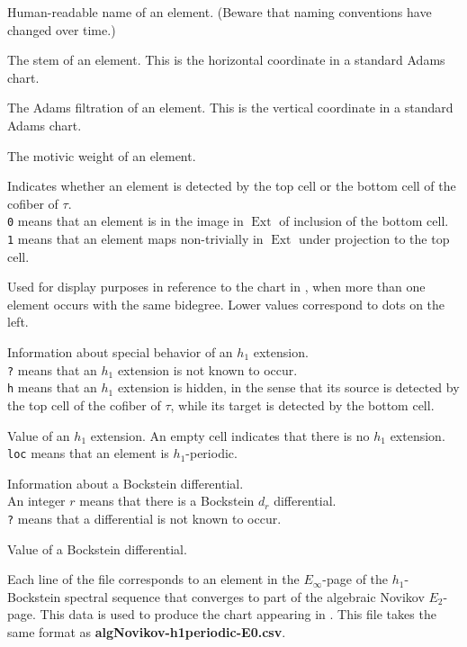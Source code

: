 \documentclass{amsart}
\DeclareMathOperator{\Ext}{Ext}
\begin{document}
  Human-readable name of an element.
(Beware that naming conventions have changed over time.)

 The stem of an element.  This is the
horizontal coordinate in a standard Adams chart.

 The Adams filtration of 
an element.  This is the vertical coordinate in a standard 
Adams chart.

 The motivic weight of an element.

 Indicates whether an element is detected by the top cell
or the bottom cell of the cofiber of $\tau$. \\
\texttt{0} means that an element is in the image in $\Ext$ 
of inclusion of the bottom cell.\\
\texttt{1} means that an element maps non-trivially in $\Ext$ 
under projection to the top cell.

 Used for display purposes
in reference to the chart in \cite{IWX19c},
when more than one element occurs with the same bidegree.
Lower values correspond to dots on the left.

Information about special behavior of an $h_1$ extension. \\
\texttt{?} means that an $h_1$ extension is not known to occur. \\
\texttt{h} means that an $h_1$ extension is hidden, in the sense
that its source is detected by the top cell of the cofiber of $\tau$,
while its target is detected by the bottom cell.

Value of an $h_1$ extension.  An empty cell indicates
that there is no $h_1$ extension. \\
\texttt{loc} means that an element is $h_1$-periodic.

Information about a Bockstein differential. \\
An integer $r$ means that there is a Bockstein $d_r$ differential. \\
\texttt{?} means that a differential is not known to occur.

Value of a Bockstein differential.

\newpage

Each line of the file corresponds to an element in the
$E_\infty$-page of the 
$h_1$-Bockstein spectral sequence that converges to part of the
algebraic Novikov $E_2$-page.
This data is used to produce the chart appearing in
\cite{IWX19a}.
This file takes the same format as
\textbf{algNovikov-h1periodic-E0.csv}.
\end{document}

